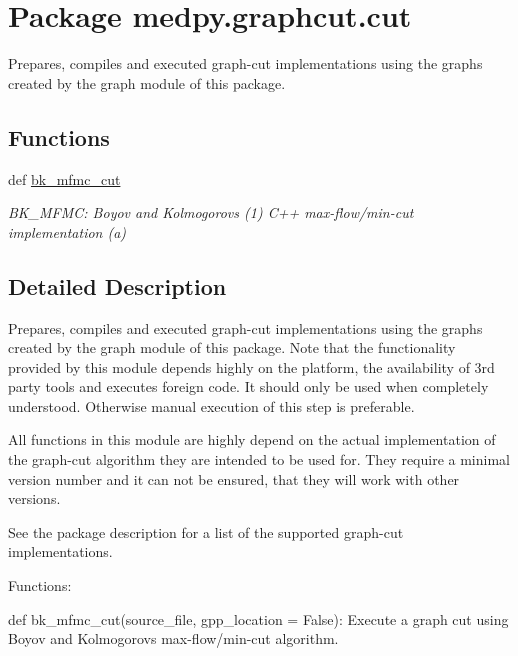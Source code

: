 \hypertarget{namespacemedpy_1_1graphcut_1_1cut}{
\section{Package medpy.graphcut.cut}
\label{namespacemedpy_1_1graphcut_1_1cut}
}


Prepares, compiles and executed graph-\/cut implementations using the graphs created by the graph module of this package.  


\subsection*{Functions}
\begin{DoxyCompactItemize}
\item 
def \hyperlink{namespacemedpy_1_1graphcut_1_1cut_a964a5abe60de2820b3e234ee7f1b0cfc}{bk\_\-mfmc\_\-cut}
\begin{DoxyCompactList}\small\item\em BK\_\-MFMC: Boyov and Kolmogorovs (1) C++ max-\/flow/min-\/cut implementation (a) \end{DoxyCompactList}\end{DoxyCompactItemize}


\subsection{Detailed Description}
Prepares, compiles and executed graph-\/cut implementations using the graphs created by the graph module of this package. Note that the functionality provided by this module depends highly on the platform, the availability of 3rd party tools and executes foreign code. It should only be used when completely understood. Otherwise manual execution of this step is preferable.

All functions in this module are highly depend on the actual implementation of the graph-\/cut algorithm they are intended to be used for. They require a minimal version number and it can not be ensured, that they will work with other versions.

See the package description for a list of the supported graph-\/cut implementations.

Functions:
\begin{DoxyItemize}
\item def bk\_\-mfmc\_\-cut(source\_\-file, gpp\_\-location = False): Execute a graph cut using Boyov and Kolmogorovs max-\/flow/min-\/cut algorithm.
\end{DoxyItemize}

